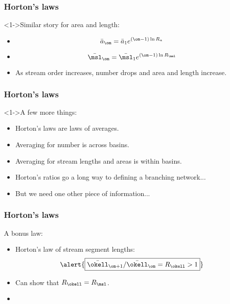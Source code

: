 \begin{frame}[label=]
  \frametitle{Horton's laws}

  \begin{block}<1->{Similar story for area and length:}
    \begin{itemize}
    \item<2->
      $$
      \bar{a}_\om = \bar{a}_1 e^{(\om-1)\ln R_a}
      $$
    \item<2->
      $$
      \bar{\msl}_\om = \bar{\msl}_1 e^{(\om-1)\ln R_\msl}
      $$
    \item<3-> As stream order increases, \alert{number drops} and
      \alert{area and length increase}.
    \end{itemize}
  \end{block}

\end{frame}

  
\begin{frame}[label=]
  \frametitle{Horton's laws}

  \begin{block}<1->{A few more things:}
    \begin{itemize}
    \item<2-> Horton's laws are laws of averages.
    \item<3-> Averaging for number is \alert{across} basins.
    \item<4-> Averaging for stream lengths and areas is \alert{within} basins.
    \item<5-> Horton's ratios go a long way to defining a branching network...
    \item<6-> But we need one other piece of information... 
    \end{itemize}
  \end{block}

\end{frame}


\begin{frame}[label=]
  \frametitle{Horton's laws}

  \begin{block}{A bonus law:}
    \begin{itemize}
    \item<1-> 
      Horton's law of stream segment lengths:
      $$
      \alert{\boxed{\bar{\okell}_{\om+1}/\bar{\okell}_{\om} = R_\okell > 1}}
      $$
    \item<2-> 
      Can show that $R_\okell = R_\msl$.
    \item<3->
    \end{itemize}
  \end{block}

\end{frame}

